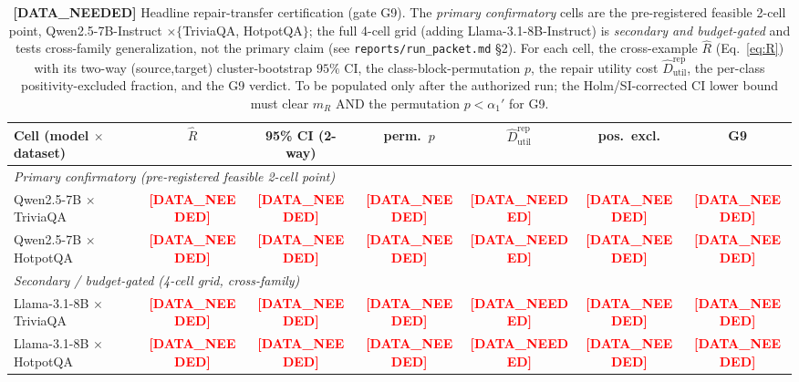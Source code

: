 \documentclass[11pt]{article}
\theoremstyle{plain}
\theoremstyle{definition}
\newcommand{\Rhat}{\widehat{R}}
\newcommand{\Dutilr}{\widehat{D}^{\mathrm{rep}}_{\mathrm{util}}}
\newcommand{\dn}{\textcolor{red}{\textbf{[DATA\_NEEDED]}}}
\begin{document}
\begin{table}[h]
\centering
\caption{\textbf{[DATA\_NEEDED]} Headline repair-transfer certification (gate G9).
The \emph{primary confirmatory} cells are the pre-registered feasible 2-cell point,
Qwen2.5-7B-Instruct $\times\{$TriviaQA, HotpotQA$\}$; the full 4-cell grid (adding
Llama-3.1-8B-Instruct) is \emph{secondary and budget-gated} and tests cross-family
generalization, not the primary claim (see \texttt{reports/run\_packet.md} \S2). For
each cell, the cross-example $\Rhat$ (Eq.~\ref{eq:R}) with its two-way (source,target)
cluster-bootstrap $95\%$ CI, the class-block-permutation $p$, the repair utility cost
$\Dutilr$, the per-class positivity-excluded fraction, and the G9 verdict. To be
populated only after the authorized run; the Holm/SI-corrected CI lower bound must
clear $m_R$ AND the permutation $p<\alpha_1'$ for G9.}
\label{tab:g9}
\begin{tabular}{lcccccc}
\toprule
Cell (model $\times$ dataset) & $\Rhat$ & 95\% CI (2-way) & perm.\ $p$ & $\Dutilr$ & pos.\ excl. & G9 \\
\midrule
\multicolumn{7}{l}{\emph{Primary confirmatory (pre-registered feasible 2-cell point)}} \\
Qwen2.5-7B $\times$ TriviaQA   & \dn & \dn & \dn & \dn & \dn & \dn \\
Qwen2.5-7B $\times$ HotpotQA   & \dn & \dn & \dn & \dn & \dn & \dn \\
\midrule
\multicolumn{7}{l}{\emph{Secondary / budget-gated (4-cell grid, cross-family)}} \\
Llama-3.1-8B $\times$ TriviaQA & \dn & \dn & \dn & \dn & \dn & \dn \\
Llama-3.1-8B $\times$ HotpotQA & \dn & \dn & \dn & \dn & \dn & \dn \\
\bottomrule
\end{tabular}
\end{table}
\end{document}
